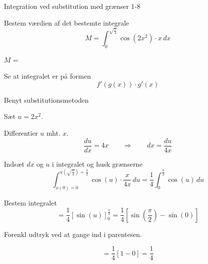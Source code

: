 \documentclass{article}
\begin{document}
\begin{exercise}{Integration ved substitution med grænser 1-8}
	
	
	Bestem værdien af det bestemte integrale
	\[
	M = \int_0^{\sqrt{\frac{\pi}{4}}} \cos(2x^2) \cdot x \, dx
	\]
	
	$M$ =  
	
	
	
	\hint
	
	Se at integralet er på formen
	\[
	f'(g(x)) \cdot g'(x)
	\]
	
	\hint
	
	Benyt substitutionsmetoden
	
	\hint
	
	Sæt $u=2x^2$.
	
	
	\hint
	
	Differentier $u$ mht. $x$.
	\[
	\frac{du}{dx} = 4x \qquad	\Rightarrow \qquad dx = \frac{du}{4x}
	\]
	
	\hint
	
	Indsæt $dx$ og $u$ i integralet og husk grænserne
	\[
	 \int_{u(0)=0}^{u\left(\sqrt{\frac{\pi}{4}}\right) = \frac{\pi}{2}} \cos(u) \cdot \frac{x}{4x} \, du = \frac{1}{4} \int_0^{\frac{\pi}{2}} \cos(u) \, du
	\]
	
	\hint
	
	Bestem integralet
	\[
	= \frac{1}{4} \left[ \sin(u) \right]_0^{\frac{\pi}{2}} =  \frac{1}{4} \left[ \sin\left(\frac{\pi}{2}\right) - \sin(0) \right]
	\]
	
	\hint
	Forenkl udtryk ved at gange ind i parentesen.
	
	\hint
	
	\[
	= \frac{1}{4} \left[ 1 - 0 \right] = \frac{1}{4}
	\]
	
	
\end{exercise}
\end{document}
